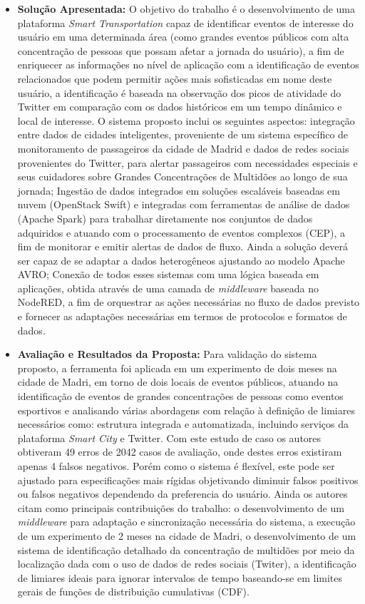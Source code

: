 \documentclass[tid,table]{texufpel} %
\begin{document}
\begin{itemize}
	\item \textbf{Solução Apresentada:} O objetivo do trabalho é o desenvolvimento de uma plataforma \textit{Smart Transportation} capaz de identificar eventos de interesse do usuário em uma determinada área (como grandes eventos públicos com alta concentração de pessoas que possam afetar a jornada do usuário), a fim de enriquecer as informações no nível de aplicação com a identificação de eventos relacionados que podem permitir ações mais sofisticadas em nome deste usuário, a identificação é baseada na observação dos picos de atividade do Twitter em comparação com os dados históricos em um tempo dinâmico e local de interesse. O sistema proposto inclui os seguintes aspectos: integração entre dados de cidades inteligentes, proveniente de um sistema específico de monitoramento de passageiros da cidade de Madrid e dados de redes sociais provenientes do Twitter, para alertar passageiros com necessidades especiais e seus cuidadores sobre Grandes Concentrações de Multidões ao longo de sua jornada; Ingestão de dados integrados em soluções escaláveis baseadas em nuvem (OpenStack Swift) e integradas com ferramentas de análise de dados (Apache Spark) para trabalhar diretamente nos conjuntos de dados adquiridos e atuando com o processamento de eventos complexos (CEP), a fim de monitorar e emitir alertas de dados de fluxo. Ainda a solução deverá ser capaz de se adaptar a dados heterogêneos ajustando ao modelo Apache AVRO; Conexão de todos esses sistemas com uma lógica baseada em aplicações, obtida através de uma camada de \textit{middleware} baseada no NodeRED, a fim de orquestrar as ações necessárias no fluxo de dados previsto e fornecer as adaptações necessárias em termos de protocolos e formatos de dados.	
	
	\item \textbf{Avaliação e Resultados da Proposta:} Para validação do sistema proposto, a ferramenta foi aplicada em um experimento de dois meses na cidade de Madri, em torno de dois locais de eventos públicos, atuando na identificação de eventos de grandes concentrações de pessoas como eventos esportivos e analisando várias abordagens com relação à definição de limiares necessários como: estrutura integrada e automatizada, incluindo serviços da plataforma \textit{Smart City} e Twitter. Com este estudo de caso os autores obtiveram 49 erros de 2042 casos de avaliação, onde destes erros existiram apenas 4 falsos negativos. Porém como o sistema é flexível, este pode ser ajustado para especificações mais rígidas objetivando diminuir falsos positivos ou falsos negativos dependendo da preferencia do usuário.
	Ainda os autores citam como principais contribuições do trabalho: o desenvolvimento de um \textit{middleware} para adaptação e sincronização necessária do sistema, a execução de um experimento de 2 meses na cidade de Madri, o desenvolvimento de um sistema de identificação detalhado da concentração  de multidões por meio da localização dada com o uso de dados de redes sociais (Twiter), a identificação de limiares ideais para ignorar intervalos de tempo baseando-se em limites gerais de funções de distribuição cumulativas (CDF).
\end{itemize}
\end{document}
